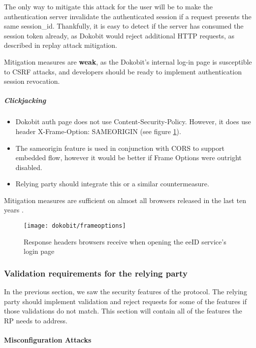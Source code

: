 The only way to mitigate this attack for the user will be to make the authentication server invalidate the authenticated session if a request presents the same session\_id. Thankfully, it is easy to detect if the server has consumed the session token already, as Dokobit would reject additional HTTP requests, as described in replay attack mitigation.

Mitigation measures are \textbf{weak}, as the Dokobit's internal log-in page is susceptible to CSRF attacks, and developers should be ready to implement authentication session revocation.

\subparagraph{Clickjacking}

\begin{itemize}
  \item Dokobit auth page does not use Content-Security-Policy. However, it does use header X-Frame-Option: {SAMEORIGIN} (see figure \ref{fig:dokobit-responseheaders}).
  \item The sameorigin feature is used in conjunction with CORS to support embedded flow, however it would be better if Frame Options were outright disabled.
  \item Relying party should integrate this or a similar countermeasure.
\end{itemize}

Mitigation measures are sufficient on almost all browsers released in the last ten years \cite{caniuse-xframeoptions}.

\begin{figure}
  \centering
  \texttt{[image: dokobit/frameoptions]}
  \caption{Response headers browsers receive when opening the eeID service's login page}
  \label{fig:dokobit-responseheaders}
\end{figure}

\subsubsection{Validation requirements for the relying party}

In the previous section, we saw the security features of the protocol. The relying party should implement validation and reject requests for some of the features if those validations do not match. This section will contain all of the features the RP needs to address.

\paragraph{Misconfiguration Attacks}

